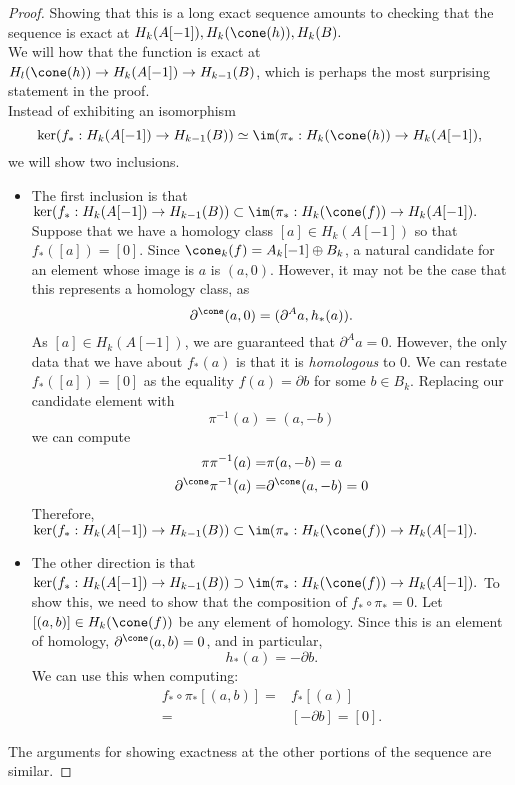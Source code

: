 \begin{proof}
Showing that this is a long exact sequence amounts to checking that the sequence is exact at $H_k(A[-1]), H_k(\cone(h)),H_k(B).$\\
We will how that the function is exact at $H_l(\cone(h))\to H_k(A[-1])\to H_{k-1}(B)$, which is perhaps the most surprising statement in the proof. \\
Instead of exhibiting an isomorphism 
\[\ker(f_*: H_k(A[-1])\to H_{k-1}(B))\simeq \im( \pi_*: H_k(\cone(h))\to H_k(A[-1]),\]
we will show two inclusions. 
\begin{itemize}
\item  The first inclusion is that $\ker(f_*: H_k(A[-1])\to H_{k-1}(B))\subset \im( \pi_*: H_k(\cone(f))\to H_k(A[-1]).$ Suppose that we have a homology class $[a]\in H_k(A[-1])$ so that $f_*([a])=[0]$. Since $\cone_k(f)=A_k[-1]\oplus B_k$, a natural candidate for an element whose image is $a$ is $(a, 0)$. However, it may not be the case that this represents a homology class, as 
\[\partial^{\cone}(a, 0)=( \partial^A a, h_*(a)).\]
As $[a]\in H_k(A[-1])$, we are guaranteed that $\partial^A a=0$. However, the only data that we have about $f_*(a)$ is that it is \emph{homologous} to $0$. We can restate $f_*([a])=[0]$ as the equality $f(a)=\partial b$ for some $b\in B_k$. Replacing our candidate element with 
\[\pi^{-1}(a)= (a, -b)\]
we can compute 
\begin{align*}
\pi \pi^{-1}(a)= &\pi(a, -b) = a\\
\partial^{\cone} \pi^{-1}(a) =& \partial^{\cone} (a, -b) = 0
\end{align*}
Therefore, $\ker(f_*: H_k(A[-1])\to H_{k-1}(B))\subset \im( \pi_*: H_k(\cone(f))\to H_k(A[-1]).$
\item The other direction is that $\ker(f_*: H_k(A[-1])\to H_{k-1}(B))\supset \im( \pi_*: H_k(\cone(f))\to H_k(A[-1]).$ To show this, we need to show that the composition of $f_*\circ \pi_*=0$. Let $[(a, b)]\in H_k(\cone(f))$ be any element of homology. Since this is an element of homology, $\partial^{\cone}(a, b)=0$, and in particular,
\[h_*(a)= - \partial b. \]
We can use this when computing:
\begin{align*}
f_*\circ \pi_*[(a, b)] =& f_*[(a)]\\
=&[-\partial b ]=[0].
\end{align*}
\end{itemize}
The arguments for showing exactness at the other portions of the sequence are similar.
\end{proof}
